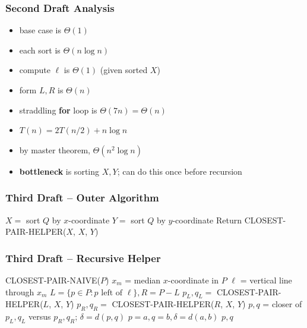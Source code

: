 \documentclass{beamer}
\begin{document}
\begin{frame} \frametitle{Second Draft Analysis}
\begin{itemize}
  \item base case is $\Theta(1)$
  \item each sort is $\Theta(n \log n)$
  \item compute $\ell$ is $\Theta(1)$ (given sorted $X$)
  \item form $L, R$ is $\Theta(n)$
  \item straddling \textbf{for} loop is $\Theta(7n) = \Theta(n)$
  \item $T(n) = 2 T(n/2) + n \log n$
  \item by master theorem, $\Theta(n^2 \log n)$
  \item \textbf{bottleneck} is sorting $X, Y$; can do this once before recursion
\end{itemize}
\end{frame}

\begin{frame} \frametitle{Third Draft -- Outer Algorithm}
\begin{algorithmic}[1]
    \State $X = $ sort $Q$ by $x$-coordinate
    \State $Y = $ sort $Q$ by $y$-coordinate
    \State Return CLOSEST-PAIR-HELPER($X$, $X$, $Y$)
  \EndFunction
\end{algorithmic}
\end{frame}

\begin{frame} \frametitle{Third Draft -- Recursive Helper}
  {\footnotesize
\begin{algorithmic}[1]
      \State \Return CLOSEST-PAIR-NAIVE($P$)
    \Else
      \State $x_m$ = median $x$-coordinate in $P$
      \State $\ell$ = vertical line through $x_m$
      \State $L = \{p \in P : p \text{ left of } \ell\}, R = P-L$
      \State $p_L, q_L = $ CLOSEST-PAIR-HELPER($L$, $X$, $Y$)
      \State $p_R, q_R = $ CLOSEST-PAIR-HELPER($R$, $X$, $Y$)
      \State $p, q$ = closer of $p_L, q_L$ versus $p_R, q_R$; $\delta=d(p,q)$
            \State $p=a, q=b, \delta=d(a,b)$
          \EndIf
        \EndFor
      \EndFor
      \State \Return $p, q$
    \EndIf
  \EndFunction
\end{algorithmic}
}
\end{frame}
\end{document}
